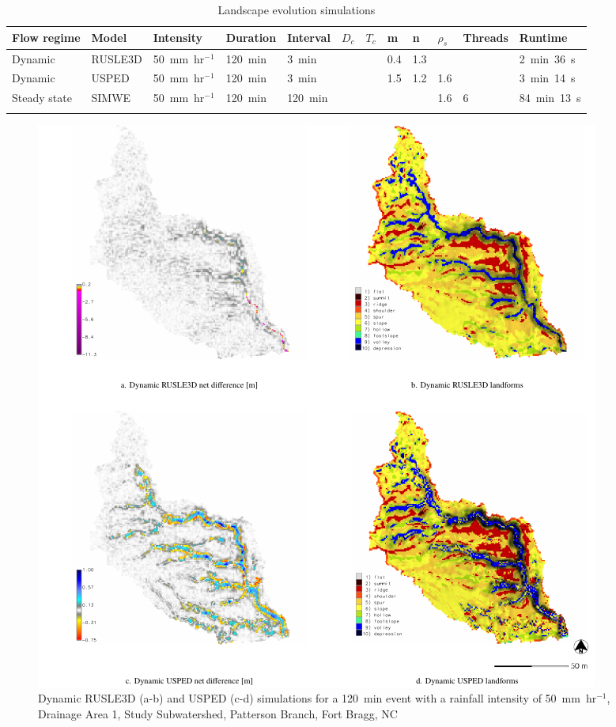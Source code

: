 \documentclass[gmd, manuscript]{copernicus}
\begin{document}
\begin{table}
\small
\caption{Landscape evolution simulations}
\begin{tabu} to \textwidth {XXXXXllllllX}
\toprule
Flow regime & Model & Intensity & Duration & Interval & $D_c$ & $T_c$ & m & n & $\rho_s$ & Threads & Runtime\\
\midrule
Dynamic & RUSLE3D & 50~\unit{mm~hr}$^{-1}$ & 120~\unit{min} & 3~\unit{min} &  &  & 0.4 & 1.3 & & & 2~\unit{min}~36~\unit{s}\\
Dynamic & USPED & 50~\unit{mm~hr}$^{-1}$ & 120~\unit{min} & 3~\unit{min} &  &  & 1.5 & 1.2 & 1.6 & & 3~\unit{min}~14~\unit{s}\\
Steady state & SIMWE & 50~\unit{mm~hr}$^{-1}$ & 120~\unit{min} & 120~\unit{min} & & & & & 1.6 & 6 & 84~\unit{min}~13~\unit{s}\\
\bottomrule
\\
\end{tabu}
\label{table:simulations} 
\end{table}


\begin{figure}
\center
\includegraphics[width=\textwidth,height=0.925\textheight,keepaspectratio]{figures/simulations.pdf}
\caption{Dynamic RUSLE3D (a-b) and USPED (c-d) simulations
for a 120~\unit{min} event with a rainfall intensity of 50~\unit{mm~hr}$^{-1}$,\\
Drainage Area 1, Study Subwatershed, Patterson Branch, Fort Bragg, NC}
\label{fig:simulations}
\end{figure}
\end{document}
